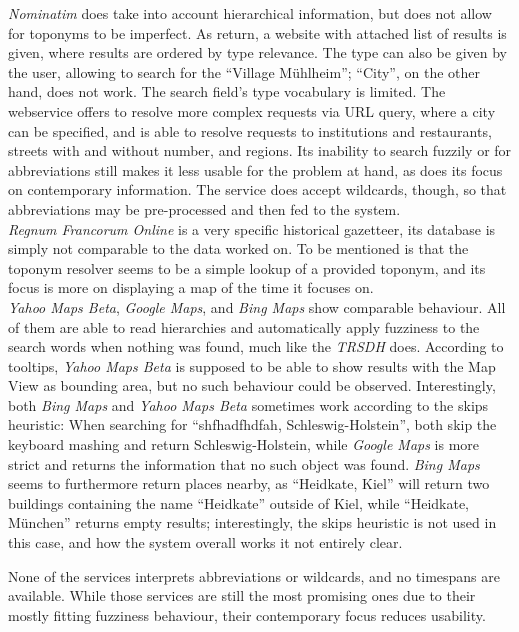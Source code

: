 \documentclass[11pt]{article}
\begin{document}
\emph{Nominatim} does take into account hierarchical information, but does not allow for toponyms to be imperfect. As return, a website with attached list of results is given, where results are ordered by type relevance. The type can also be given by the user, allowing to search for the ``Village Mühlheim''; ``City'', on the other hand, does not work. The search field's type vocabulary is limited. The webservice offers to resolve more complex requests via URL query, where a city can be specified, and is able to resolve requests to institutions and restaurants, streets with and without number, and regions. Its inability to search fuzzily or for abbreviations still makes it less usable for the problem at hand, as does its focus on contemporary information. The service does accept wildcards, though, so that abbreviations may be pre-processed and then fed to the system.\\

\emph{Regnum Francorum Online} is a very specific historical gazetteer, its database is simply not comparable to the data worked on. To be mentioned is that the toponym resolver seems to be a simple lookup of a provided toponym, and its focus is more on displaying a map of the time it focuses on.\\

\emph{Yahoo Maps Beta}, \emph{Google Maps}, and \emph{Bing Maps} show comparable behaviour. All of them are able to read hierarchies and automatically apply fuzziness to the search words when nothing was found, much like the \emph{TRSDH} does. According to tooltips, \emph{Yahoo Maps Beta} is supposed to be able to show results with the Map View as bounding area, but no such behaviour could be observed. Interestingly, both \emph{Bing Maps} and \emph{Yahoo Maps Beta} sometimes work according to the skips heuristic: When searching for ``shfhadfhdfah, Schleswig-Holstein'', both skip the keyboard mashing and return Schleswig-Holstein, while \emph{Google Maps} is more strict and returns the information that no such object was found. \emph{Bing Maps} seems to furthermore return places nearby, as ``Heidkate, Kiel'' will return two buildings containing the name ``Heidkate'' outside of Kiel, while ``Heidkate, München'' returns empty results; interestingly, the skips heuristic is not used in this case, and how the system overall works it not entirely clear.

None of the services interprets abbreviations or wildcards, and no timespans are available. While those services are still the most promising ones due to their mostly fitting fuzziness behaviour, their contemporary focus reduces usability.\\
\end{document}
